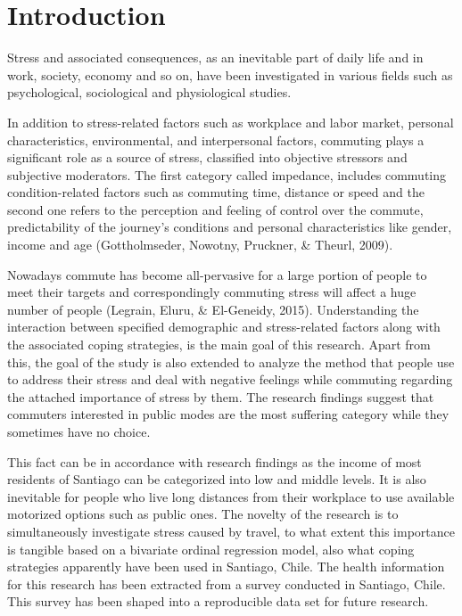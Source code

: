 \documentclass[
11pt, %
oneside, %
english, %
singlespacing, %
]{macthesis} %
\begin{document}
\hypertarget{introduction-1}{%
\section{Introduction}\label{introduction-1}}

Stress and associated consequences, as an inevitable part of daily life and in work, society, economy and so on, have been investigated in various fields such as psychological, sociological and physiological studies.

In addition to stress-related factors such as workplace and labor market, personal characteristics, environmental, and interpersonal factors, commuting plays a significant role as a source of stress, classified into objective stressors and subjective moderators. The first category called impedance, includes commuting condition-related factors such as commuting time, distance or speed and the second one refers to the perception and feeling of control over the commute, predictability of the journey's conditions and personal characteristics like gender, income and age (Gottholmseder, Nowotny, Pruckner, \& Theurl, 2009).

Nowadays commute has become all-pervasive for a large portion of people to meet their targets and correspondingly commuting stress will affect a huge number of people (Legrain, Eluru, \& El-Geneidy, 2015). Understanding the interaction between specified demographic and stress-related factors along with the associated coping strategies, is the main goal of this research. Apart from this, the goal of the study is also extended to analyze the method that people use to address their stress and deal with negative feelings while commuting regarding the attached importance of stress by them. The research findings suggest that commuters interested in public modes are the most suffering category while they sometimes have no choice.

This fact can be in accordance with research findings as the income of most residents of Santiago can be categorized into low and middle levels. It is also inevitable for people who live long distances from their workplace to use available motorized options such as public ones. The novelty of the research is to simultaneously investigate stress caused by travel, to what extent this importance is tangible based on a bivariate ordinal regression model, also what coping strategies apparently have been used in Santiago, Chile. The health information for this research has been extracted from a survey conducted in Santiago, Chile. This survey has been shaped into a reproducible data set for future research.
\end{document}
